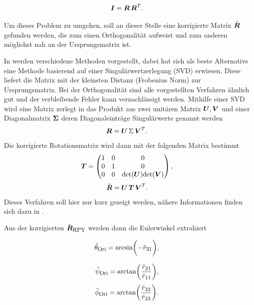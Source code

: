 \begin{equation}
    \mbox{\boldmath ${I}$} = \mbox{\boldmath ${R}$}\,\mbox{\boldmath ${R}$}^T. 
\end{equation}

Um dieses Problem zu umgehen, soll an dieser Stelle eine korrigierte Matrix $\tilde{\mbox{\boldmath ${R}$}}$ gefunden werden, die zum einen Orthogonalität aufweist und zum anderen möglichst nah an der Ursprungsmatrix ist.

In \cite{sarabandi_solution_2023} werden verschiedene Methoden vorgestellt, dabei hat sich als beste Alternative eine Methode basierend auf einer Singulärwertzerlegung (SVD) erwiesen. Diese liefert die Matrix mit der kleinsten Distanz (Frobenius Norm) zur Ursprungsmatrix. Bei der Orthogonalität sind alle vorgestellten Verfahren ähnlich gut und der verbleibende Fehler kann vernachlässigt werden. Mithilfe einer SVD wird eine Matrix zerlegt in das Produkt aus zwei unitären Matrix $\mbox{\boldmath ${U}$},\mbox{\boldmath ${V}$}$ und einer Diagonalmatrix $\mbox{\boldmath ${\Sigma}$}$ deren Diagonaleinträge Singulärwerte genannt werden 
\begin{equation}
    \mbox{\boldmath ${R}$} = \mbox{\boldmath ${U}$} \,\Sigma\, \mbox{\boldmath ${V}$}^T.
    \label{eq:SVDDef}
\end{equation}
Die korrigierte Rotationsmatrix wird dann mit der folgenden Matrix bestimmt
\begin{equation}
    \mbox{\boldmath ${T}$} = \begin{pmatrix}
        1 & 0 & 0\\
        0 & 1 & 0\\
        0 & 0 & \text{det}(\mbox{\boldmath ${U}$})\text{det}(\mbox{\boldmath ${V}$})
        \end{pmatrix},
\end{equation}
\begin{equation}
    \tilde{\mbox{\boldmath ${R}$}} = \mbox{\boldmath ${U}$}\,\mbox{\boldmath ${T}$}\,\mbox{\boldmath ${V}$}^T.
\end{equation}
Dieses Verfahren soll hier nur kurz gezeigt werden, nähere Informationen finden sich dazu in \cite{mao_optimal_1986}.

Aus der korrigierten $\tilde{\mbox{\boldmath ${R}$}}_{\textrm{\footnotesize{RPY}}}$ werden dann die Eulerwinkel extrahiert

\begin{equation}
    \hat{\theta}_{\textrm{\footnotesize{Ori}}} = \arcsin\biggl(-\tilde{r}_{\textrm{\footnotesize{31}}}\biggr),
    \label{eq:ThetaOri}
\end{equation}

\begin{equation}
    \hat{\psi}_{\textrm{\footnotesize{Ori}}} = \arctan\biggl(\frac{\tilde{r}_{\textrm{\footnotesize{21}}}}{\tilde{r}_{\textrm{\footnotesize{11}}}}\biggr),
    \label{eq:PsiOri}
\end{equation}
\begin{equation}
    \hat{\phi}_{\textrm{\footnotesize{Ori}}} = \arctan\biggl(\frac{\tilde{r}_{\textrm{\footnotesize{32}}}}{\tilde{r}_{\textrm{\footnotesize{33}}}}\biggr).
    \label{eq:PhiOri}
\end{equation}

